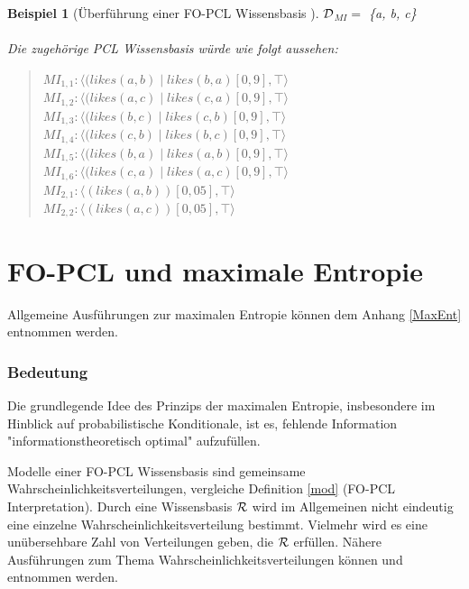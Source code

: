 \documentclass[a4paper, 11pt]{book}
\newtheorem{Bsp}{Beispiel}[section]
\begin{document}
\begin{Bsp}[Überführung einer FO-PCL Wissensbasis ]
	$ \cal{D} $$_{MI}  =$ \{a, b, c\} \\
	\\
	Die zugehörige PCL Wissensbasis würde wie folgt aussehen:
	\begin{quote}
	$ MI_{1,1}: \langle (likes(a, b) \mid likes(b, a)[0,9], \top \rangle $\\
	$ MI_{1,2} : \langle (likes(a, c) \mid likes(c, a)[0,9], \top \rangle$\\
	$ MI_{1,3}: \langle (likes(b, c) \mid likes(c, b)[0,9], \top \rangle $\\
	$ MI_{1,4} : \langle (likes(c, b) \mid likes(b, c)[0,9], \top \rangle$\\
	$ MI_{1,5} : \langle (likes(b, a) \mid likes(a, b)[0,9], \top \rangle$\\
	$ MI_{1,6} : \langle (likes(c, a) \mid likes(a, c)[0,9], \top \rangle$\\		
	$ MI_{2,1} : \langle (likes(a, b))[0,05], \top \rangle$\\
	$ MI_{2,2} : \langle (likes(a, c))[0,05], \top \rangle$\\
	\end{quote}

	
\end{Bsp}

\section{FO-PCL und maximale Entropie}   \label{Fo-PCL-MaxEnt}
Allgemeine Ausführungen zur maximalen Entropie können dem Anhang \ref{MaxEnt} entnommen werden.
\subsubsection{Bedeutung}

Die grundlegende Idee des Prinzips der maximalen Entropie, insbesondere im Hinblick auf probabilistische Konditionale, ist es, fehlende Information "{}informationstheoretisch optimal"{} aufzufüllen.

Modelle einer FO-PCL Wissensbasis  sind gemeinsame Wahrscheinlichkeitsverteilungen, vergleiche Definition \ref{mod} (FO-PCL Interpretation).
Durch eine Wissensbasis $ \cal R $ wird im Allgemeinen nicht eindeutig eine einzelne Wahrscheinlichkeitsverteilung bestimmt. Vielmehr wird es eine unübersehbare Zahl von Verteilungen geben, die $ \cal R $ erfüllen.
Nähere Ausführungen zum Thema Wahrscheinlichkeitsverteilungen können \cite[Anhang A, S. 437ff]{BKI08} und \cite[Kap. 5, S. 14ff]{Fis10} entnommen werden.
\end{document}
